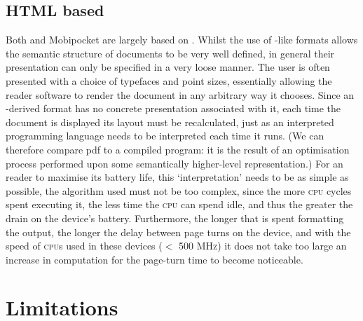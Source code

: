 \subsection{HTML based}
\label{html-format}
Both \epub{} and Mobipocket are largely based on \html{}. Whilst the use of \xml{}-like formats
allows the semantic structure of documents to be very well defined, in general their presentation
can only be specified in a very loose manner. The user is often presented with a choice of typefaces
and point sizes, essentially allowing the reader software to render the document in any arbitrary
way it chooses. Since an \html{}-derived format has no concrete presentation associated with it,
each time the document is displayed its layout must be recalculated, just as
an interpreted programming language needs to be interpreted each time it runs. (We can therefore
compare \gls{pdf} to a compiled program: it is the result of an optimisation process performed upon
some semantically higher-level representation.) For an \ebook{} reader to maximise its battery life,
this `interpretation' needs to be as simple as possible, \ie{} the algorithm used must not be too
complex, since the more \textsc{cpu} cycles spent executing it, the
less time the \textsc{cpu} can spend idle, and thus the greater the drain on the device's battery.
Furthermore, the longer that is spent formatting the output, the longer the delay between page turns
on the device, and with the speed of \textsc{cpu}s used in these devices ($<$ 500 \textsc{MHz}) it
does not take too large an increase in computation for the page-turn time to become noticeable.



\section{Limitations}



